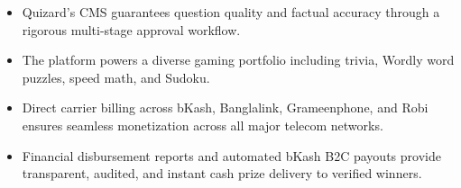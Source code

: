 \begin{tcolorbox}[summarybox, title={Chapter Key Takeaways}]
\begin{itemize}
    \item Quizard's CMS guarantees question quality and factual accuracy through a rigorous multi-stage approval workflow.
    \item The platform powers a diverse gaming portfolio including trivia, Wordly word puzzles, speed math, and Sudoku.
    \item Direct carrier billing across bKash, Banglalink, Grameenphone, and Robi ensures seamless monetization across all major telecom networks.
    \item Financial disbursement reports and automated bKash B2C payouts provide transparent, audited, and instant cash prize delivery to verified winners.
\end{itemize}
\end{tcolorbox}
